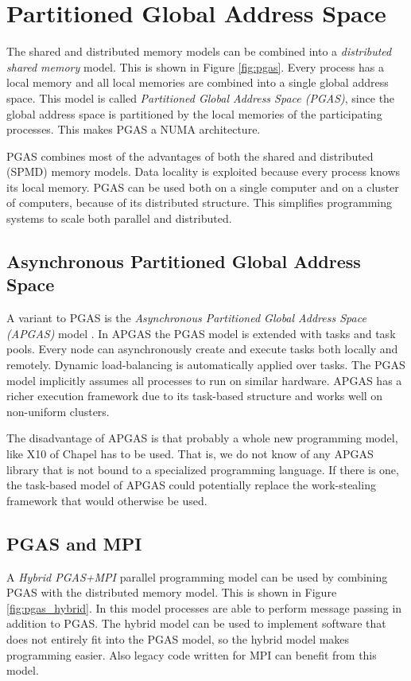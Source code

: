 \section{Partitioned Global Address Space}
The shared and distributed memory models can be combined into a \emph{distributed shared memory} model. This is shown in Figure \ref{fig:pgas}. Every process has a local memory and all local memories are combined into a single global address space. This model is called \emph{Partitioned Global Address Space (PGAS)}, since the global address space is partitioned by the local memories of the participating processes. This makes PGAS a NUMA architecture.

PGAS combines most of the advantages of both the shared and distributed (SPMD) memory models. Data locality is exploited because every process knows its local memory. PGAS can be used both on a single computer and on a cluster of computers, because of its distributed structure. This simplifies programming systems to scale both parallel and distributed. 

\subsection{Asynchronous Partitioned Global Address Space}
A variant to PGAS is the \emph{Asynchronous Partitioned Global Address Space (APGAS)} model \cite{APGAS}. In APGAS the PGAS model is extended with tasks and task pools. Every node can asynchronously create and execute tasks both locally and remotely. Dynamic load-balancing is automatically applied over tasks. The PGAS model implicitly assumes all processes to run on similar hardware. APGAS has a richer execution framework due to its task-based structure and works well on non-uniform clusters. 

The disadvantage of APGAS is that probably a whole new programming model, like X10 of Chapel has to be used. That is, we do not know of any APGAS library that is not bound to a specialized programming language. If there is one, the task-based model of APGAS could potentially replace the work-stealing framework that would otherwise be used.

\subsection{PGAS and MPI}
A \emph{Hybrid PGAS+MPI} parallel programming model can be used by combining PGAS with the distributed memory model. This is shown in Figure \ref{fig:pgas_hybrid}. In this model processes are able to perform message passing in addition to PGAS. The hybrid model can be used to implement software that does not entirely fit into the PGAS model, so the hybrid model makes programming easier. Also legacy code written for MPI can benefit from this model.

